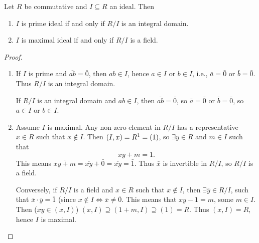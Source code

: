 \documentclass[10pt, a4paper]{article}
\begin{document}
\begin{proposition}
    Let $R$ be commutative and $I \subseteq R$ an ideal.
    Then
    \begin{enumerate}[label = (\roman*)]
        \item $I$ is prime ideal if and only if $R / I$ is an integral domain.

        \item $I$ is maximal ideal if and only if $R / I$ is a field.
    \end{enumerate}

    \begin{proof}\phantom{}
        \begin{enumerate}[label = (\roman*)]
            \item If $I$ is prime and $\overline{ab} = \bar{0}$,
            then $ab \in I$,
            hence $a \in I$ or $b \in I$,
            i.e.,
            $\bar{a} = \bar{0}$ or $\bar{b} = \bar{0}$.
            Thus $R / I$ is an integral domain.

            If $R / I$ is an integral domain and $ab \in I$,
            then $\overline{ab} = \bar{0}$\footnotemark,
            so $\bar{a} = \bar{0}$ or $\bar{b} = \bar{0}$,
            so $a \in I$ or $b \in I$.

            \item
            Assume $I$ is maximal.
            Any non-zero element in $R / I$ has a representative $x \in R$ such that $x \notin I$.
            Then $(I, x) = R\footnotemark = (1)$,
            so $\exists y \in R$ and $m \in I$ such that
            \[
            xy + m = 1.
            \]
            This means $\overline{xy + m} = \overline{xy} + \bar{0} = \overline{xy} = \bar{1}$.
            Thus $\bar{x}$ is invertible in $R / I$,
            so $R / I$ is a field.

            Conversely,
            if $R / I$ is a field and $x \in R$ such that $x \notin I$,
            then $\exists \bar{y} \in R / I$,
            such that $\bar{x}\cdot\bar{y} = \bar{1}$
            (since $x \notin I \iff \bar{x} \neq \bar{0}$.
            This means that $xy - 1 = m$,
            some $m \in I$.
            Then
            ($xy \in (x, I)$)
            $(x, I) \supseteq (1 + m, I) \supseteq (1) = R$.
            Thus $(x, I) = R$,
            hence $I$ is maximal.
        \end{enumerate}
    \end{proof}
\end{proposition}
\end{document}
